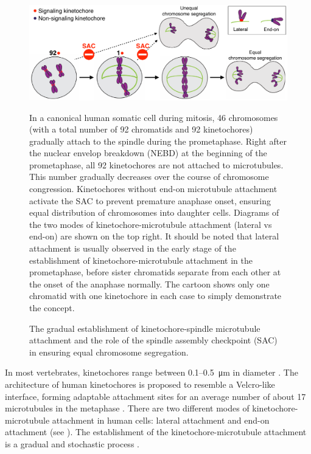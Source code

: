 \begin{figure}
    \centering
    \includegraphics[width=\textwidth]{chapters/figures/SACRole.pdf}
    \caption{The gradual establishment of kinetochore-spindle microtubule attachment and the role of the spindle assembly checkpoint (SAC) in ensuring equal chromosome segregation.}
    \noindent\justifying In a canonical human somatic cell during mitosis, 46 chromosomes (with a total number of 92 chromatids and 92 kinetochores) gradually attach to the spindle during the prometaphase. Right after the nuclear envelop breakdown (NEBD) at the beginning of the prometaphase, all 92 kinetochores are not attached to microtubules. This number gradually decreases over the course of chromosome congression. Kinetochores without end-on microtubule attachment activate the SAC to prevent premature anaphase onset, ensuring equal distribution of chromosomes into daughter cells. Diagrams of the two modes of kinetochore-microtubule attachment (lateral vs end-on) are shown on the top right. It should be noted that lateral attachment is usually observed in the early stage of the establishment of kinetochore-microtubule attachment in the prometaphase, before sister chromatids separate from each other at the onset of the anaphase normally. The cartoon shows only one chromatid with one kinetochore in each case to simply demonstrate the concept.
    \label{SACRole}
\end{figure}

In most vertebrates, kinetochores range between 0.1--\SI{0.5}{\micro m} in diameter \cite{Rieder+Salmon1998}. The architecture of human kinetochores is proposed to resemble a Velcro-like interface, forming adaptable attachment sites for an average number of about 17 microtubules in the metaphase \cite{Wendell1993, Zaytsev2014, Zaytsev2015, Velcro, Kukreja2020}. There are two different modes of kinetochore-microtubule attachment in human cells: lateral attachment and end-on attachment (see ). The establishment of the kinetochore-microtubule attachment is a gradual and stochastic process \cite{GradualStochastic}.

